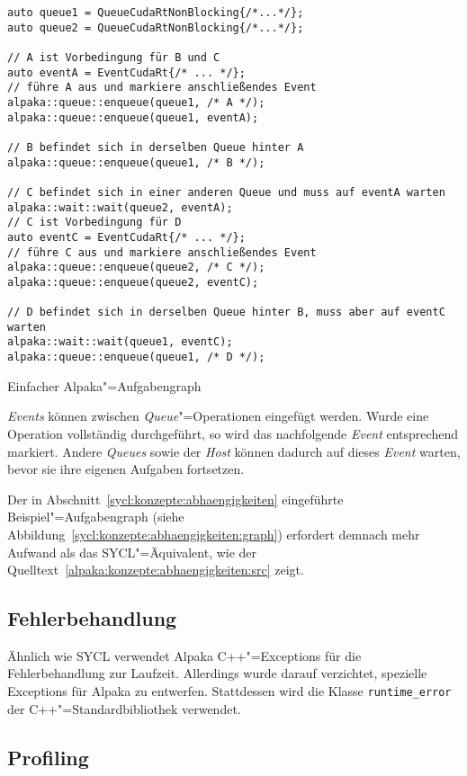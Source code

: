 \begin{code}
    \begin{verbatim}
auto queue1 = QueueCudaRtNonBlocking{/*...*/};
auto queue2 = QueueCudaRtNonBlocking{/*...*/};

// A ist Vorbedingung für B und C
auto eventA = EventCudaRt{/* ... */};
// führe A aus und markiere anschließendes Event
alpaka::queue::enqueue(queue1, /* A */);
alpaka::queue::enqueue(queue1, eventA);

// B befindet sich in derselben Queue hinter A
alpaka::queue::enqueue(queue1, /* B */);

// C befindet sich in einer anderen Queue und muss auf eventA warten
alpaka::wait::wait(queue2, eventA);
// C ist Vorbedingung für D
auto eventC = EventCudaRt{/* ... */};
// führe C aus und markiere anschließendes Event
alpaka::queue::enqueue(queue2, /* C */);
alpaka::queue::enqueue(queue2, eventC);

// D befindet sich in derselben Queue hinter B, muss aber auf eventC warten
alpaka::wait::wait(queue1, eventC);
alpaka::queue::enqueue(queue1, /* D */);
    \end{verbatim}
    \caption{Einfacher Alpaka"=Aufgabengraph}
    \label{alpaka:konzepte:abhaengigkeiten:src}
\end{code}

\textit{Events} können zwischen \textit{Queue}"=Operationen eingefügt werden.
Wurde eine Operation vollständig durchgeführt, so wird das nachfolgende
\textit{Event} entsprechend markiert. Andere \textit{Queues} sowie der
\textit{Host} können dadurch auf dieses \textit{Event} warten, bevor sie ihre
eigenen Aufgaben fortsetzen.

Der in Abschnitt~\ref{sycl:konzepte:abhaengigkeiten} eingeführte
Beispiel"=Aufgabengraph (siehe
Abbildung~\ref{sycl:konzepte:abhaengigkeiten:graph}) erfordert demnach mehr
Aufwand als das SYCL"=Äquivalent, wie der
Quelltext~\ref{alpaka:konzepte:abhaengigkeiten:src} zeigt.

\subsection{Fehlerbehandlung}

Ähnlich wie SYCL verwendet Alpaka C++"=Exceptions für die Fehlerbehandlung zur
Laufzeit. Allerdings wurde darauf verzichtet, spezielle Exceptions für Alpaka
zu entwerfen. Stattdessen wird die Klasse \texttt{runtime\_error} der
C++"=Standardbibliothek verwendet.

\subsection{Profiling}

